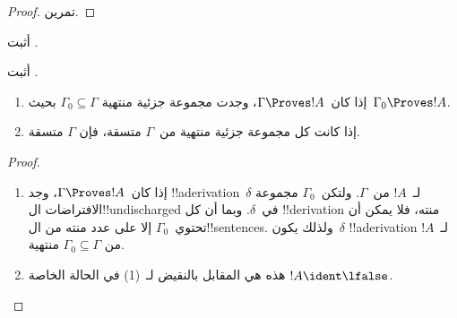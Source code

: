 \documentclass[../../../include/open-logic-section]{subfiles}
\begin{document}
\begin{proof}
تمرين.
\end{proof}

\begin{prob}
أثبت .
\end{prob}
\tagendprob

\begin{prob}
أثبت .
\end{prob}
\tagendprob

\begin{prop}[التراص]
  \begin{enumerate}
  \item إذا كان~$\Gamma \Proves !A$، وجدت مجموعة جزئية منتهية
    $\Gamma_0 \subseteq \Gamma$ بحيث~$\Gamma_0 \Proves !A$.
  \item إذا كانت كل مجموعة جزئية منتهية من~$\Gamma$ متسقة، فإن
    $\Gamma$ متسقة.
  \end{enumerate}
\end{prop}

\begin{proof}
  \begin{enumerate}
    \item إذا كان~$\Gamma \Proves !A$، وجد !!a{derivation}~$\delta$
      لـ~$!A$ من~$\Gamma$. ولتكن~$\Gamma_0$ مجموعة الافتراضات
      ال!!{undischarged} في~$\delta$. وبما أن كل !!{derivation} منته،
      فلا يمكن أن تحتوي~$\Gamma_0$ إلا على عدد منته من
      ال!!{sentence}s. ولذلك يكون~$\delta$ !!a{derivation} لـ~$!A$ من
      $\Gamma_0 \subseteq \Gamma$ منتهية.
    \item هذه هي المقابل بالنقيض لـ~(1) في الحالة الخاصة
      $!A \ident \lfalse$.
  \end{enumerate}
\end{proof}
\end{document}
